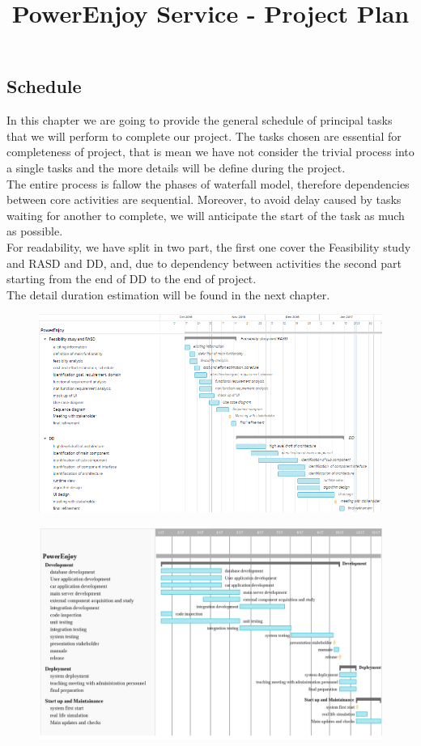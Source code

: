 \documentclass{article}
\title{PowerEnjoy Service - Project Plan}
\begin{document}
\subsection{Schedule}
In this chapter we are going to provide the general schedule of principal tasks that we will perform to complete our project. The tasks chosen are essential for completeness of project, that is mean we have not consider the trivial process into a single tasks and the more details will be define during the project.\\
The entire process is fallow the phases of waterfall model, therefore dependencies between core activities are sequential. Moreover, to avoid delay caused by tasks waiting for another to complete, we will anticipate the start of the task as much as possible. \\
For readability, we have split in two part, the first one cover the Feasibility study and RASD and DD, and, due to dependency between activities the second part starting from the end of DD to the end of project.\\ 
The detail duration estimation will be found in the next chapter. 

\begin{figure}[H]
\centering
\includegraphics[width=1.2\textwidth]{schedule1.png} 
\end{figure}

\begin{figure}[H]
\centering
\includegraphics[width=1.2\textwidth]{schedule2.png} 
\end{figure}
\end{document}
